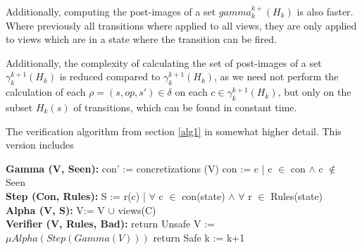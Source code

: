 Additionally, computing the post-images of a set $gamma_k^{k+}(H_k)$ is also faster. Where previously all transitions where applied to all views, they are only applied to views which are in a state where the transition can be fired.

Additionally, the complexity of calculating the set of post-images of a set $\gamma_k^{k+1}(H_k)$ is reduced compared to $\gamma_k^{k+1}(H_k)$, as we need not perform the calculation of each $\rho = (s, op, s') \in \delta$ on each $c \in \gamma_k^{k+1}(H_k)$, but only on the subset $H_k(s)$ of transitions, which can be found in constant time.


\begin{algorithm}
  \caption{The verification algorithm from section \ref{alg1} in somewhat higher detail. This version includes }\label{euclid}
  \begin{algorithmic}[1]
    \State \textbf{Gamma (V, Seen):}
    \State \hspace{6 mm} con' := concretizations (V)
    \State \hspace{6 mm} con  := c | c $\in$ con $\land$ c $\notin$ Seen
    \\
    \State \textbf{Step (Con, Rules):}
    \State \hspace{6 mm} S := r(c) | $\forall$ c $\in$ con(state) $\land$ $\forall$ r $\in$ Rules(state)
    \EndFor
    \\
    \State \textbf{Alpha (V, S):}
    \State \hspace{6 mm} V:= V $\cup$ views(C)
    \\
    \State \textbf{Verifier (V, Rules, Bad):}
        \State return Unsafe
        \EndIf
        \State V := $\mu Alpha(Step(Gamma(V)))$
        \State return Safe
        \EndIf
        \State k := k+1
      \EndFor
\end{algorithmic}
\end{algorithm}


\newpage
